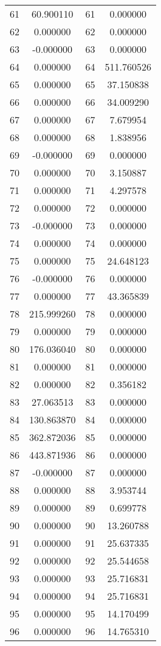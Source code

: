 \documentclass[12pt]{article}
\begin{document}
\begin{longtable}{@{}cccc@{}}
61 & 60.900110 & 61 & 0.000000 \\
62 & 0.000000 & 62 & 0.000000 \\
63 & -0.000000 & 63 & 0.000000 \\
64 & 0.000000 & 64 & 511.760526 \\
65 & 0.000000 & 65 & 37.150838 \\
66 & 0.000000 & 66 & 34.009290 \\
67 & 0.000000 & 67 & 7.679954 \\
68 & 0.000000 & 68 & 1.838956 \\
69 & -0.000000 & 69 & 0.000000 \\
70 & 0.000000 & 70 & 3.150887 \\
71 & 0.000000 & 71 & 4.297578 \\
72 & 0.000000 & 72 & 0.000000 \\
73 & -0.000000 & 73 & 0.000000 \\
74 & 0.000000 & 74 & 0.000000 \\
75 & 0.000000 & 75 & 24.648123 \\
76 & -0.000000 & 76 & 0.000000 \\
77 & 0.000000 & 77 & 43.365839 \\
78 & 215.999260 & 78 & 0.000000 \\
79 & 0.000000 & 79 & 0.000000 \\
80 & 176.036040 & 80 & 0.000000 \\
81 & 0.000000 & 81 & 0.000000 \\
82 & 0.000000 & 82 & 0.356182 \\
83 & 27.063513 & 83 & 0.000000 \\
84 & 130.863870 & 84 & 0.000000 \\
85 & 362.872036 & 85 & 0.000000 \\
86 & 443.871936 & 86 & 0.000000 \\
87 & -0.000000 & 87 & 0.000000 \\
88 & 0.000000 & 88 & 3.953744 \\
89 & 0.000000 & 89 & 0.699778 \\
90 & 0.000000 & 90 & 13.260788 \\
91 & 0.000000 & 91 & 25.637335 \\
92 & 0.000000 & 92 & 25.544658 \\
93 & 0.000000 & 93 & 25.716831 \\
94 & 0.000000 & 94 & 25.716831 \\
95 & 0.000000 & 95 & 14.170499 \\
96 & 0.000000 & 96 & 14.765310 \\

\end{longtable}
\end{document}
